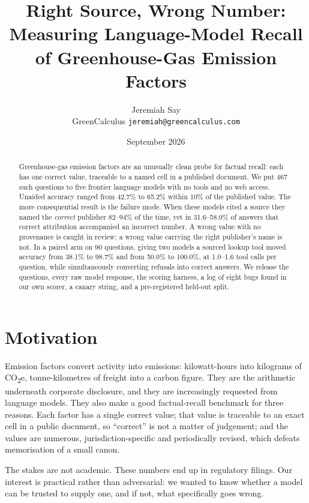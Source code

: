 \documentclass[10pt,a4paper]{article}
\title{\vspace{-2.2em}\textbf{Right Source, Wrong Number:\\Measuring Language-Model Recall of Greenhouse-Gas Emission Factors}\vspace{-0.6em}}
\author{Jeremiah Say\\\small GreenCalculus \quad \texttt{jeremiah@greencalculus.com}}
\date{\vspace{-1em}\small September 2026}
\begin{document}
\maketitle
\vspace{-1.5em}

\begin{abstract}
\small
Greenhouse-gas emission factors are an unusually clean probe for factual recall: each has one correct value, traceable to a named cell in a published document. We put 467 such questions to five frontier language models with no tools and no web access. Unaided accuracy ranged from 42.7\% to 65.2\% within 10\% of the published value. The more consequential result is the failure mode. When these models cited a source they named the \emph{correct} publisher 82--94\% of the time, yet in 31.6--58.0\% of answers that correct attribution accompanied an incorrect number. A wrong value with no provenance is caught in review; a wrong value carrying the right publisher's name is not. In a paired arm on 90 questions, giving two models a sourced lookup tool moved accuracy from 38.1\% to 98.7\% and from 50.0\% to 100.0\%, at 1.0--1.6 tool calls per question, while simultaneously converting refusals into correct answers. We release the questions, every raw model response, the scoring harness, a log of eight bugs found in our own scorer, a canary string, and a pre-registered held-out split.
\end{abstract}

\vspace{-0.6em}
\section{Motivation}

Emission factors convert activity into emissions: kilowatt-hours into kilograms of CO\textsubscript{2}e, tonne-kilometres of freight into a carbon figure. They are the arithmetic underneath corporate disclosure, and they are increasingly requested from language models. They also make a good factual-recall benchmark for three reasons. Each factor has a single correct value; that value is traceable to an exact cell in a public document, so ``correct'' is not a matter of judgement; and the values are numerous, jurisdiction-specific and periodically revised, which defeats memorisation of a small canon.

The stakes are not academic. These numbers end up in regulatory filings. Our interest is practical rather than adversarial: we wanted to know whether a model can be trusted to supply one, and if not, what specifically goes wrong.
\end{document}
